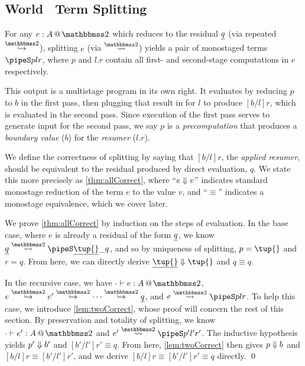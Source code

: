 \begin{abstrsyn}

\subsection{World \bbtwo\ Term Splitting}

For any $\coltwo e A$
which reduces to the residual $\underline{q}$ (via repeated $\stepsym \bbtwo$),
splitting $e$ (via $\splittwosym$)
yields a pair of monostaged terms $\pipeS p l r$, where $p$ and $l.r$
contain all first- and second-stage computations in $e$ respectively.

This output is a multistage program in its own right.
It evaluates by reducing $p$ to $b$ in the first pass,
then plugging that result in for $l$ to produce $[b/l]r$,
which is evaluated in the second pass.
Since execution of the first pass serves to generate input for
the second pass, we say $p$ is a {\em precomputation} that produces a
{\em boundary value} ($b$) for the {\em resumer} ($l.r$).

We define the correctness of splitting 
by saying that $[b/l]r$, the \emph{applied resumer}, should be equivalent 
to the residual produced by direct evaluation, $q$.
We state this more precisely as \ref{thm:allCorrect},
where ``${e} \Downarrow {v}$'' indicates standard monostage reduction of the term $e$ to the value $v$,
and ``$\equiv$'' indicates a monostage equivalence, which we cover later.

We prove \ref{thm:allCorrect} by induction on the steps of evaluation.  
In the base case, where $e$ is already a residual of the form $\underline{q}$, we know
$\splittwo {\exv q} A {\exv{\tup{}}} \_ q$, and so by uniqueness of splitting, 
$p = \tup{}$ and $r = q$.
From here, we can directly derive $\reduce {\exv {\tup {}}} {\tup {}}$ and $q \equiv q$.

In the recursive case, we have 
$\typestwo [\cdot] e A$, $e \stepsym \bbtwo e' \stepsym \bbtwo \cdots \stepsym \bbtwo \exv q$, and $\splittwo e A p l r$.
To help this case, we introduce \ref{lem:twoCorrect}, whose proof will concern the rest of this section.
By preservation and totality of splitting, we know $\typestwo [\cdot] {e'} A$ and $\splittwo {e'} A {p'} {l'} {r'}$.
The inductive hypothesis yields ${p'} \Downarrow {b'}$ and $[b'/l']r' \equiv q$.
From here, \ref{lem:twoCorrect} then gives ${p} \Downarrow {b}$ and $[b/l]r \equiv [b'/l']r'$,
and we derive $[b/l]r \equiv [b'/l']r' \equiv q$ directly. \qed


\end{abstrsyn}

